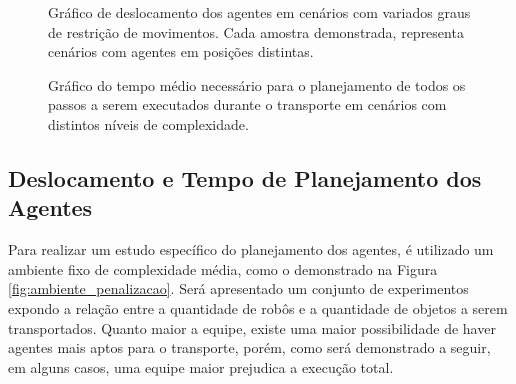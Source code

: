 \begin{figure}[h]
  \centering
  \setlength{\fboxsep}{0pt}
  \caption{Gráfico de deslocamento dos agentes em cenários com variados graus de restrição de movimentos. Cada amostra demonstrada, representa cenários com agentes em posições distintas.}
  \label{fig:cenarios_robo}
\end{figure}

\begin{figure}[h]
  \centering
  \setlength{\fboxsep}{0pt}
  \caption[Gráfico do tempo médio necessário para o planejamento total do sistema]{Gráfico do tempo médio necessário para o planejamento de todos os passos a serem executados durante o transporte em cenários com distintos níveis de complexidade.}
  \label{fig:cenarios_tempo}
\end{figure}


\clearpage

\subsection{Deslocamento e Tempo de Planejamento dos Agentes} %
\label{sub:deslocamento_e_templo_de_planejamento_dos_agentes}

Para realizar um estudo específico do planejamento dos agentes, é utilizado um ambiente fixo de complexidade média, como o demonstrado na Figura \ref{fig:ambiente_penalizacao}. Será apresentado um conjunto de experimentos expondo a relação entre a quantidade de robôs e a quantidade de objetos a serem transportados.
Quanto maior a equipe, existe uma maior possibilidade de haver agentes mais aptos para o transporte, porém, como será demonstrado a seguir, em alguns casos, uma equipe maior prejudica a execução total.

